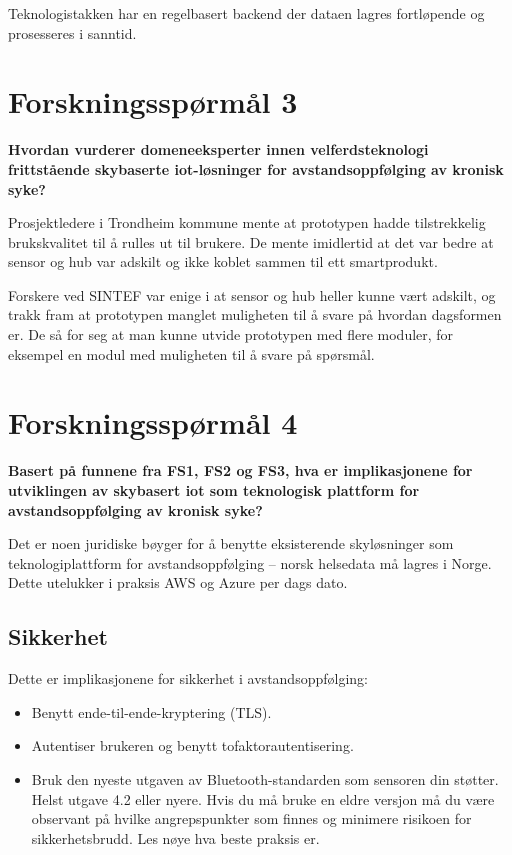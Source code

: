Teknologistakken har en regelbasert backend der dataen lagres fortløpende og
prosesseres i sanntid.


\section{Forskningsspørmål 3}
\textbf{Hvordan vurderer domeneeksperter innen velferdsteknologi frittstående skybaserte \gls{iot}-løsninger
for avstandsoppfølging av kronisk syke?}

Prosjektledere i Trondheim kommune mente at prototypen hadde tilstrekkelig
brukskvalitet til å rulles ut til brukere. De mente imidlertid at det var bedre at
sensor og hub var adskilt og ikke koblet sammen til ett smartprodukt.

Forskere ved SINTEF var enige i at sensor og hub heller kunne vært adskilt, og trakk
fram at prototypen manglet muligheten til å svare på hvordan
dagsformen er. De så for seg at man kunne utvide prototypen med flere moduler,
for eksempel en modul med muligheten til å svare på spørsmål.

\section{Forskningsspørmål 4}
\textbf{Basert på funnene fra FS1, FS2 og FS3, hva er implikasjonene for utviklingen av skybasert \gls{iot} som teknologisk plattform
    for avstandsoppfølging av kronisk syke?}

Det er noen juridiske bøyger for å benytte eksisterende skyløsninger som teknologiplattform
for avstandsoppfølging -- norsk helsedata må lagres i Norge. Dette utelukker i
praksis AWS og Azure per dags dato.

\subsection{Sikkerhet}
Dette er implikasjonene for sikkerhet i avstandsoppfølging:

\begin{itemize}
  \item Benytt ende-til-ende-kryptering (TLS).
  \item Autentiser brukeren og benytt tofaktorautentisering.
  \item Bruk den nyeste utgaven av Bluetooth-standarden som sensoren din
  støtter. Helst utgave 4.2 eller nyere. Hvis du må bruke en eldre versjon må
  du være observant på hvilke angrepspunkter som finnes og minimere risikoen for
  sikkerhetsbrudd. Les nøye hva beste praksis er.
\end{itemize}


